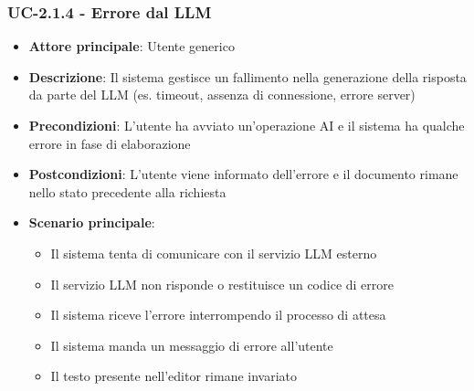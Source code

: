 \documentclass[11pt,a4paper]{article}
\begin{document}
\subsubsection{UC-2.1.4 - Errore dal LLM}
\begin{itemize}
    \item \textbf{Attore principale}: Utente generico
    \item \textbf{Descrizione}: Il sistema gestisce un fallimento nella generazione della risposta da parte del LLM (es. timeout, assenza di connessione, errore server)
    \item \textbf{Precondizioni}: L'utente ha avviato un'operazione AI e il sistema ha qualche errore in fase di elaborazione
    \item \textbf{Postcondizioni}: L’utente viene informato dell'errore e il documento rimane nello stato precedente alla richiesta
    \item \textbf{Scenario principale}:
    \begin{itemize}
        \item Il sistema tenta di comunicare con il servizio LLM esterno
        \item Il servizio LLM non risponde o restituisce un codice di errore
        \item Il sistema riceve l'errore interrompendo il processo di attesa
        \item Il sistema manda un messaggio di errore all'utente
        \item Il testo presente nell’editor rimane invariato
    \end{itemize}
\end{itemize}
\end{document}
